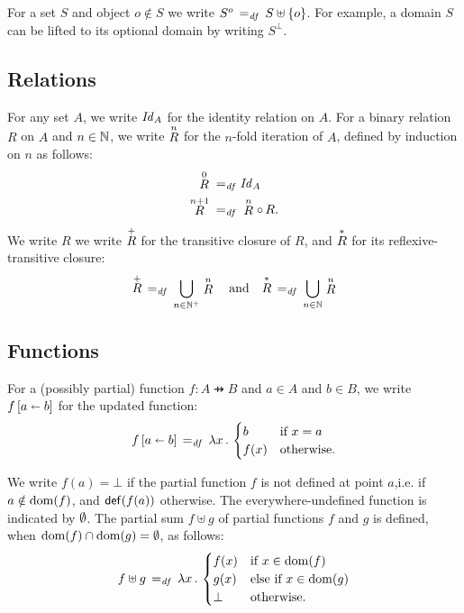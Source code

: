 \documentclass[11pt]{report}
\begin{document}
For a set $S$ and object $o \notin S$ we write $S^o \eqdef S \uplus \set{o}$. For example, a domain $S$ can be lifted to its optional domain by writing $S^\bot$. 

\subsection{Relations}
\label{sec:relations}

For any set $A$, we write $\ident{A}$ for the identity relation on $A$. For a binary relation $R$ on $A$ and $n \in \setnaturals$, we write $\relexp{R}{n}$ for the $n$-fold iteration of $A$, defined by induction on $n$ as follows: \begin{align*} \relexp{R}{0} \eqdef &\ident{A} \\ 
\relexp{R}{n+1} \eqdef & \relexp{R}{n} \rcomp R.\end{align*} We write $R$ we write $\tcl{R}$ for the transitive closure of $R$, and $\rtcl{R}$ for its reflexive-transitive closure: \begin{align*}
    \tcl{R} \eqdef \bigcup_{n \in \setpositives} \relexp{R}{n} \text{~~~and~~~}
    \rtcl{R} \eqdef \bigcup_{n \in \setnaturals} \relexp{R}{n} 
\end{align*}

\subsection{Functions}
\label{sec:functions}

For a (possibly partial) function $f : A \pfun B$ and $a \in A$ and $b \in B$, we write $\funup{f}{\ptup{a}{b}}$ for the updated function: \[ \funup{f}{\ptup{a}{b}} \eqdef \fun{x} \begin{cases}
	b & \text{if $x = a$} \\
	f(x) & \text{otherwise.}
\end{cases}\] 

We write $f(a) = \bot$ if the partial function $f$ is not defined at point $a$,i.e. if $a \notin \dom{f}$, and $\defined{f(a)}$ otherwise. The everywhere-undefined function is indicated by $\nil$. The partial sum $f \uplus g$ of partial functions $f$ and $g$ is defined, when $\dom{f} \cap \dom{g} = \nil$, as follows: \[ f \uplus g \eqdef \fun{x}\begin{cases}
    f(x) & \text{if $x \in \dom{f}$} \\
    g(x) & \text{else if $x \in \dom{g}$} \\
    \bot & \text{otherwise.}
\end{cases}\]
\end{document}
